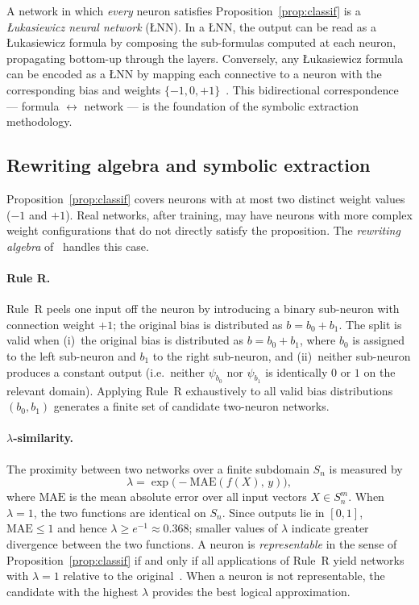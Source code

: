 \documentclass[lettersize,journal]{IEEEtran}
\newcommand{\LNN}{\L{}NN}
\begin{document}
A network in which \emph{every} neuron satisfies Proposition~\ref{prop:classif}
is a \emph{\L{}ukasiewicz neural network} (\LNN{}).
In a \LNN{}, the output can be read as a \L{}ukasiewicz formula by composing
the sub-formulas computed at each neuron, propagating bottom-up through the
layers.
Conversely, any \L{}ukasiewicz formula can be encoded as a \LNN{} by mapping
each connective to a neuron with the corresponding bias and weights
$\{-1, 0, +1\}$~\cite{amato2002}.
This bidirectional correspondence --- formula $\leftrightarrow$ network ---
is the foundation of the symbolic extraction methodology.

\subsection{Rewriting algebra and symbolic extraction}
\label{ssec:rewriting}

Proposition~\ref{prop:classif} covers neurons with at most two distinct weight
values ($-1$ and $+1$).
Real networks, after training, may have neurons with more complex weight
configurations that do not directly satisfy the proposition.
The \emph{rewriting algebra} of~\cite{leandro2009} handles this case.

\paragraph{Rule R.}
Rule~R peels one input off the neuron by introducing a binary sub-neuron with
connection weight $+1$; the original bias is distributed as $b = b_0 + b_1$.
The split is valid when (i)~the original bias is distributed as $b = b_0 + b_1$,
where $b_0$ is assigned to the left sub-neuron and $b_1$ to the right
sub-neuron, and (ii)~neither sub-neuron produces a constant output
(i.e.\ neither $\psi_{b_0}$ nor $\psi_{b_1}$ is identically $0$ or $1$
on the relevant domain).
Applying Rule~R exhaustively to all valid bias distributions $(b_0, b_1)$
generates a finite set of candidate two-neuron networks.

\paragraph{$\lambda$-similarity.}
The proximity between two networks over a finite subdomain $S_n$ is measured by
\begin{equation}
  \lambda = \exp\bigl(-\mathrm{MAE}(f(X),\, y)\bigr),
  \label{eq:lambda}
\end{equation}
where $\mathrm{MAE}$ is the mean absolute error over all input vectors
$X \in S_n^m$.
When $\lambda = 1$, the two functions are identical on $S_n$.
Since outputs lie in $[0,1]$, $\mathrm{MAE} \leq 1$ and hence
$\lambda \geq e^{-1} \approx 0.368$; smaller values of $\lambda$ indicate
greater divergence between the two functions.
A neuron is \emph{representable} in the sense of Proposition~\ref{prop:classif}
if and only if all applications of Rule~R yield networks with $\lambda = 1$
relative to the original~\cite{leandro2009}.
When a neuron is not representable, the candidate with the highest $\lambda$
provides the best logical approximation.
\end{document}

